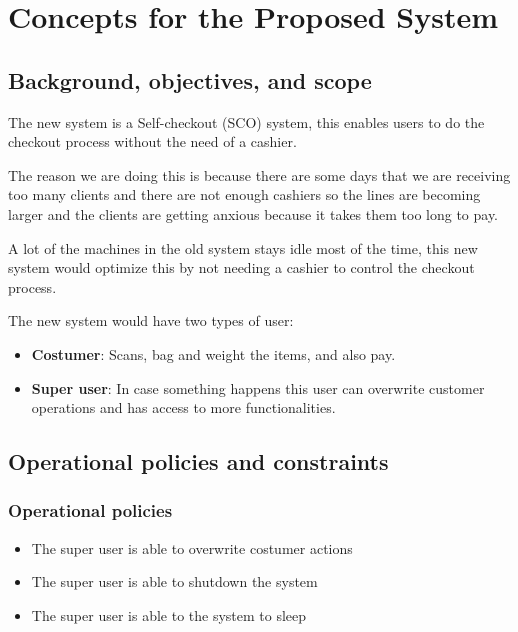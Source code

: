 \section{Concepts for the Proposed System}

\subsection{Background, objectives, and scope}

The new system is a Self-checkout (SCO) system, this enables users to do 
the checkout process without the need of a cashier. 
\newline

\noindent
The reason we are doing this is because there are some days that we are 
receiving too many clients and there are not enough cashiers so the lines are 
becoming larger and the clients are getting anxious because it takes them 
too long to pay. 
\newline

\noindent
A lot of the machines in the old system stays idle most of the time, this new 
system would optimize this by not needing a cashier to control the 
checkout process. 
\newline

The new system would have two types of user:
\begin{itemize}
	\item \textbf{Costumer}: Scans, bag and weight the items, and also pay.
	\item \textbf{Super user}: In case something happens this user can 
    overwrite customer operations and has access to more functionalities.
\end{itemize}

\subsection{Operational policies and constraints}

\subsubsection{Operational policies}
\begin{itemize}
    \item The super user is able to overwrite costumer actions
    \item The super user is able to shutdown the system
    \item The super user is able to the system to sleep
\end{itemize}

